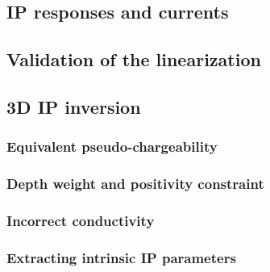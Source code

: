 \documentclass[a4paper, 11pt]{article}
\begin{document}
\subsection{IP responses and currents}



\subsection{Validation of the linearization}



\subsection{3D IP inversion}



\subsubsection{Equivalent pseudo-chargeability}



\subsubsection{Depth weight and positivity constraint}



\subsubsection{Incorrect conductivity}



\subsubsection{Extracting intrinsic IP parameters}





\end{document}

